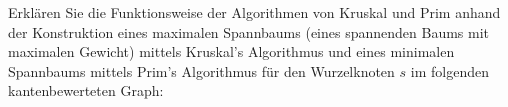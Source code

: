 
\begin{exercise}

Erklären Sie die Funktionsweise der Algorithmen von Kruskal und Prim anhand der Konstruktion eines maximalen Spannbaums (eines spannenden Baums mit maximalen Gewicht) mittels Kruskal's Algorithmus und eines minimalen Spannbaums mittels Prim's Algorithmus für den Wurzelknoten $s$ im folgenden kantenbewerteten Graph:

\begin{center}
    
\end{center}


\end{exercise}


